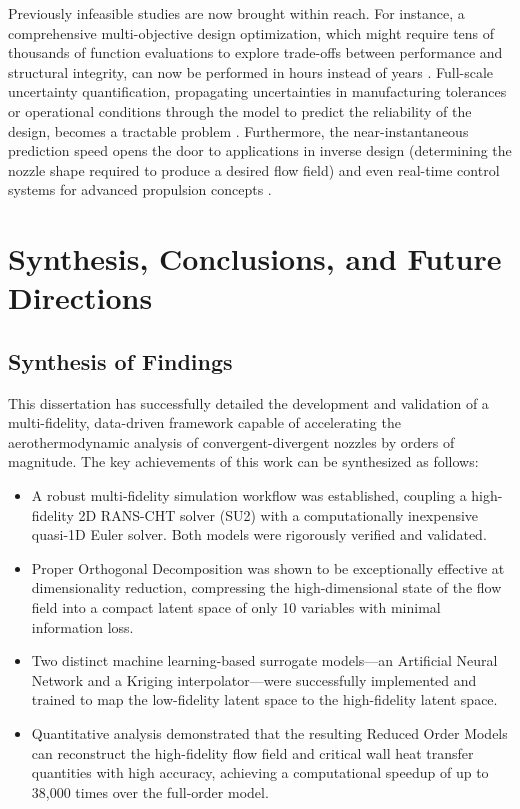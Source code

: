 \documentclass[tg, EN]{ufabcFHZh_tg}
\begin{document}
Previously infeasible studies are now brought within reach. For instance, a comprehensive multi-objective design optimization, which might require tens of thousands of function evaluations to explore trade-offs between performance and structural integrity, can now be performed in hours instead of years \citep{deb2002, toffol2018}. Full-scale uncertainty quantification, propagating uncertainties in manufacturing tolerances or operational conditions through the model to predict the reliability of the design, becomes a tractable problem \citep{ng2018, lemaitre2010}. Furthermore, the near-instantaneous prediction speed opens the door to applications in inverse design (determining the nozzle shape required to produce a desired flow field) and even real-time control systems for advanced propulsion concepts \citep{moreira2023, hesthaven2016}.

\chapter{Synthesis, Conclusions, and Future Directions}
\label{chap:conclusions_future_work}

\section{Synthesis of Findings}

This dissertation has successfully detailed the development and validation of a multi-fidelity, data-driven framework capable of accelerating the aerothermodynamic analysis of convergent-divergent nozzles by orders of magnitude. The key achievements of this work can be synthesized as follows:
\begin{itemize}
    \item A robust multi-fidelity simulation workflow was established, coupling a high-fidelity 2D RANS-CHT solver (SU2) with a computationally inexpensive quasi-1D Euler solver. Both models were rigorously verified and validated.
    \item Proper Orthogonal Decomposition was shown to be exceptionally effective at dimensionality reduction, compressing the high-dimensional state of the flow field into a compact latent space of only 10 variables with minimal information loss.
    \item Two distinct machine learning-based surrogate models—an Artificial Neural Network and a Kriging interpolator—were successfully implemented and trained to map the low-fidelity latent space to the high-fidelity latent space.
    \item Quantitative analysis demonstrated that the resulting Reduced Order Models can reconstruct the high-fidelity flow field and critical wall heat transfer quantities with high accuracy, achieving a computational speedup of up to 38,000 times over the full-order model.
\end{itemize}
\end{document}
